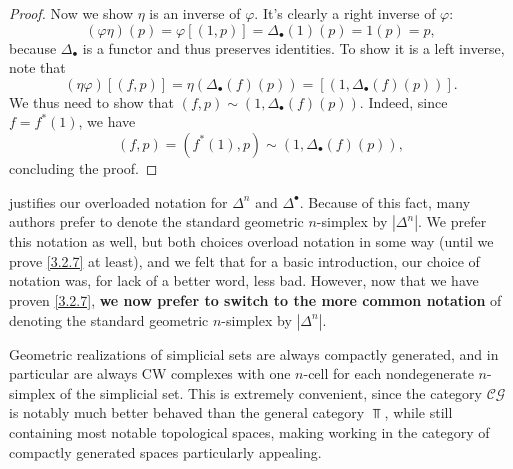 \begin{proof}
    Now we show $\eta$ is an inverse of $\varphi$. It's clearly a right inverse of $\varphi$:
    \[
    (\varphi\eta)(p)=\varphi[(1,p)]=\Delta_\bullet(1)(p)=1(p)=p,
    \]
    because $\Delta_\bullet$ is a functor and thus preserves identities. To show it is a left inverse, note that
    \[
    (\eta\varphi)[(f,p)]=\eta(\Delta_\bullet(f)(p))=[(1,\Delta_\bullet(f)(p))].
    \]
    We thus need to show that $(f,p)\sim(1,\Delta_\bullet(f)(p))$. Indeed, since $f=f^*(1)$, we have
    \[
    (f,p)=(f^*(1),p)\sim (1,\Delta_\bullet(f)(p)),
    \]
    concluding the proof.
\end{proof}

\begin{remark}\label{3.2.8}
     justifies our overloaded notation for $\Delta^n$ and $\Delta^\bullet$. Because of this fact, many authors prefer to denote the standard geometric $n$-simplex by $|\Delta^n|$. We prefer this notation as well, but both choices overload notation in some way (until we prove \cref{3.2.7} at least), and we felt that for a basic introduction, our choice of notation was, for lack of a better word, less bad. However, now that we have proven \cref{3.2.7}, \textbf{we now prefer to switch to the more common notation} of denoting the standard geometric $n$-simplex by $\left|\Delta^n\right|$.
\end{remark}

\begin{remark}\label{3.2.9}
	Geometric realizations of simplicial sets are always compactly generated, and in particular are always CW complexes with one $n$-cell for each nondegenerate $n$-simplex of the simplicial set. This is extremely convenient, since the category $\mathcal{C} \mathcal{G} $ is notably much better behaved than the general category $\Top $, while still containing most notable topological spaces, making working in the category of compactly generated spaces particularly appealing.
\end{remark}

